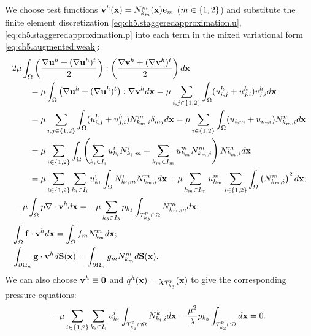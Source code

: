 We choose test functions $\mathbf{v}^h(\mathbf{x}) = N^m_{k_m}(\mathbf{x}) \mathbf{e}_m$ ($m \in \left\lbrace 1,2 \right\rbrace$) and substitute the finite element discretization \eqref{eq:ch5.staggeredapproximation.u}, \eqref{eq:ch5.staggeredapproximation.p} into each term in the mixed variational form \eqref{eq:ch5.augmented.weak}:
\begin{align*}
& 2 \mu \int_{\Omega} \left( \frac{\nabla \mathbf{u}^h + (\nabla \mathbf{u}^h)^t}{2} \right) : \left( \frac{\nabla \mathbf{v}^h + (\nabla \mathbf{v}^h)^t}{2} \right) d\mathbf{x} \\
& \qquad = \mu \int_{\Omega} \left( \nabla \mathbf{u}^h + (\nabla \mathbf{u}^h)^t \right) : \nabla \mathbf{v}^h d\mathbf{x} = \mu \sum_{i,j \in \left\lbrace 1,2 \right\rbrace} \int_{\Omega} (u^h_{i,j} + u^h_{j,i}) v^h_{j,i} d\mathbf{x} \\
& \qquad = \mu \sum_{i,j \in \left\lbrace 1,2 \right\rbrace} \int_{\Omega} (u^h_{i,j} + u^h_{j,i}) N^m_{k_m,i} \delta_{mj} d\mathbf{x} = \mu \sum_{i \in \left\lbrace 1,2 \right\rbrace} \int_{\Omega} (u_{i,m}+u_{m,i}) N^m_{k_m,i} d\mathbf{x} \\
& \qquad = \mu \sum_{i \in \left\lbrace 1,2 \right\rbrace} \int_{\Omega} \left( \sum_{k_i \in I_i} u^i_{k_i} N^i_{k_i,m} + \sum_{k_m \in I_m} u^m_{k_m} N^m_{k_m,i} \right) N^m_{k_m,i} d\mathbf{x} \\
& \qquad = \mu \sum_{i \in \left\lbrace 1,2 \right\rbrace} \sum_{k_i \in I_i} u^i_{k_i} \int_{\Omega} N^i_{k_i,m} N^m_{k_m,i} d\mathbf{x} + \mu \sum_{k_m \in I_m} u^m_{k_m} \sum_{i \in \left\lbrace 1,2 \right\rbrace} \int_{\Omega} \left( N^m_{k_m,i} \right)^2 d\mathbf{x}; \\
& -\mu \int_{\Omega} p \nabla \cdot \mathbf{v}^h d\mathbf{x} = -\mu \sum_{k_3 \in I_3} p_{k_3} \int_{T^p_{k_3} \cap \Omega} N^m_{k_m,m} d\mathbf{x}; \\
& \int_{\Omega} \mathbf{f} \cdot \mathbf{v}^h d\mathbf{x} = \int_{\Omega} f_m N^m_{k_m} d\mathbf{x}; \\
& \int_{\partial\Omega_n} \mathbf{g} \cdot \mathbf{v}^h d\mathbf{S}(\mathbf{x}) = \int_{\partial\Omega_n} g_m N^m_{k_m} d\mathbf{S}(\mathbf{x}).
\end{align*}
We can also choose $\mathbf{v}^h \equiv \mathbf{0}$ and $q^h(\mathbf{x}) = \chi_{T^p_{k_3}}(\mathbf{x})$ to give the corresponding pressure equations:
\begin{equation*}
-\mu \sum_{i \in \left\lbrace 1,2 \right\rbrace} \sum_{k_i \in I_i} u^i_{k_i} \int_{T^p_{k_3} \cap \Omega} N^k_{k_i,i} d\mathbf{x} - \frac{\mu^2}{\lambda} p_{k_3} \int_{T^p_{k_3} \cap \Omega} d\mathbf{x} = 0.
\end{equation*}


